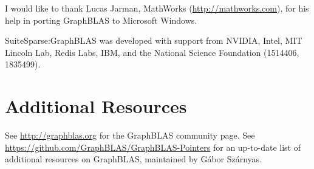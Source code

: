\documentclass[12pt]{article}
\begin{document}
I would like to thank Lucas Jarman, MathWorks (\url{http://mathworks.com}),
for his help in porting GraphBLAS to Microsoft Windows.

SuiteSparse:GraphBLAS was developed with support from
NVIDIA, Intel, MIT Lincoln Lab, Redis Labs, IBM,
and the National Science Foundation (1514406, 1835499).

\section{Additional Resources}

See \url{http://graphblas.org} for the GraphBLAS community page.  See
\url{https://github.com/GraphBLAS/GraphBLAS-Pointers} for an up-to-date list of
additional resources on GraphBLAS, maintained by G{\'{a}}bor Sz{\'{a}}rnyas.

\newpage
{\small
{}


}
\end{document}
